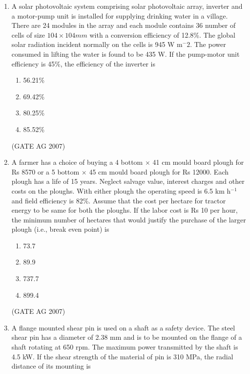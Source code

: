 \documentclass[journal,12pt,onecolumn]{IEEEtran}
\theoremstyle{remark}
\begin{document}
\begin{enumerate}
\item  A solar photovoltaic system comprising solar photovoltaic array, inverter and a motor-pump unit is installed for supplying drinking water in a village. There are 24 modules in the array and each module contains 36 number of cells of size $104 \times 104 mm$ with a conversion efficiency of 12.8\%. The global solar radiation incident normally on the cells is 945 W m$^-2$. The power consumed in lifting the water is found to be 435 W. If the pump-motor unit efficiency is 45\%, the efficiency of the inverter is 
\begin{multicols}{4}
\begin{enumerate}
    \item  56.21\%
    \item  69.42\%
    \item  80.25\%
    \item  85.52\%
\end{enumerate}
\end{multicols}
\hfill(GATE AG 2007)

  \item A farmer has a choice of buying a 4 bottom $\times$ 41 cm mould board plough for Rs 8570 or a 5 bottom $\times$ 45 cm mould board plough for Rs 12000. Each plough has a life of 15 years. Neglect salvage value, interest charges and other costs on the ploughs. With either plough the operating speed is 6.5 km h$^{-1}$ and field efficiency is 82\%. Assume that the cost per hectare for tractor energy to be same for both the ploughs. If the labor cost is Rs 10 per hour, the minimum number of hectares that would justify the purchase of the larger plough (i.e., break even point) is  
\begin{multicols}{4}
\begin{enumerate}
    \item  73.7
    \item  89.9
    \item  737.7
    \item  899.4
\end{enumerate}
    
\end{multicols}
\hfill(GATE AG 2007)

\item  A flange mounted shear pin is used on a shaft as a safety device. The steel shear pin has a diameter of 2.38 mm and is to be mounted on the flange of a shaft rotating at 650 rpm. The maximum power transmitted by the shaft is 4.5 kW. If the shear strength of the material of pin is 310 MPa, the radial distance of its mounting is


\end{enumerate}
\end{document}
